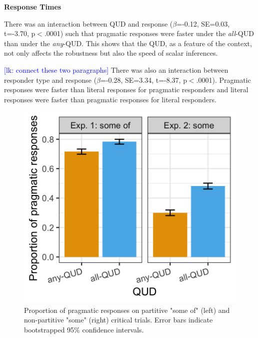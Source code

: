 \documentclass[10pt,letterpaper]{article}
\newcommand{\lk}[1]{\textcolor{Blue}{[lk: #1]}}
\begin{document}
\noindent \textbf{Response Times} 

There was an interaction between QUD and response ($\beta$=-0.12, SE=0.03, t=-3.70, p$<$.0001) such that pragmatic responses were faster under the \textit{all}-QUD than under the \textit{any}-QUD. This shows that the QUD, as a feature of the context, not only affects the robustness but also the speed of scalar inferences. 

\lk{connect these two paragraphs}
There was also  an interaction between responder type and response ($\beta$=-0.28, SE=3.34, t=-8.37, p$<$.0001). Pragmatic responses were faster than literal responses for pragmatic responders and literal responses were faster than pragmatic responses for literal responders.

\begin{figure}
\includegraphics[width=\columnwidth]{plots/judgements.png}
\caption{Proportion of pragmatic responses on partitive "some of" (left) and non-partitive "some" (right) critical trials. Error bars indicate bootstrapped 95\% confidence intervals. \label{fig:judgements}}
\end{figure}
\end{document}
